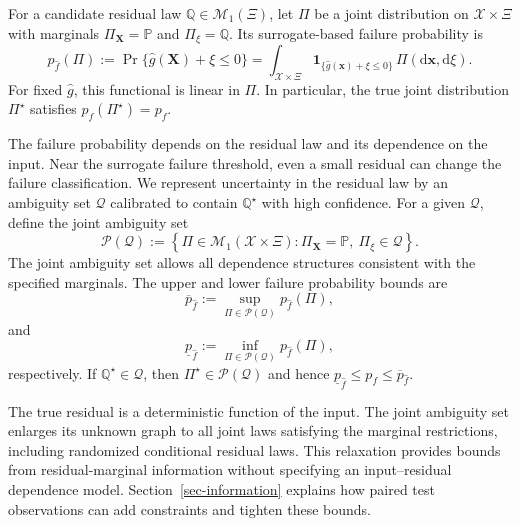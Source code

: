 \documentclass[review,11pt,3p,authoryear,nopreprintline]{elsarticle}
\begin{document}
For a candidate residual law $\mathbb Q\in\mathcal M_1(\Xi)$, let $\Pi$ be a joint distribution on $\mathcal X\times\Xi$ with marginals $\Pi_{\bm X}=\mathbb P$ and $\Pi_\xi=\mathbb Q$. Its surrogate-based failure probability is
\begin{equation}
  p_{\hat f}(\Pi):=\Pr\{\hat g(\bm X)+\xi\le0\}=\int_{\mathcal X\times\Xi}\mathbf 1_{\{\hat g(\bm x)+\xi\le0\}}\,\Pi(\mathrm d\bm x,\mathrm d\xi).
  \label{eq-surrogate-failure-probability}
\end{equation}
For fixed $\hat g$, this functional is linear in $\Pi$. In particular, the true joint distribution $\Pi^\star$ satisfies $p_{\hat f}(\Pi^\star)=p_f$.

The failure probability depends on the residual law and its dependence on the input. Near the surrogate failure threshold, even a small residual can change the failure classification. We represent uncertainty in the residual law by an ambiguity set $\mathcal Q$ calibrated to contain $\mathbb Q^\star$ with high confidence. For a given $\mathcal Q$, define the joint ambiguity set
\[
  \mathcal P(\mathcal Q) :=\left\{\Pi\in\mathcal M_1(\mathcal X\times\Xi):\Pi_{\bm X}=\mathbb P,\ \Pi_\xi\in\mathcal Q\right\}.
\]
The joint ambiguity set allows all dependence structures consistent with the specified marginals. The upper and lower failure probability bounds are
\begin{equation}
  \overline p_{\hat f}:=\sup_{\Pi\in\mathcal P(\mathcal Q)}p_{\hat f}(\Pi),
  \label{eq-upper-bound}
\end{equation}
and
\begin{equation}
  \underline p_{\hat f}:=\inf_{\Pi\in\mathcal P(\mathcal Q)}p_{\hat f}(\Pi),
  \label{eq-lower-bound}
\end{equation}
respectively. If $\mathbb Q^\star\in\mathcal Q$, then $\Pi^\star\in\mathcal P(\mathcal Q)$ and hence $\underline p_{\hat f}\le p_f\le\overline p_{\hat f}$.

The true residual is a deterministic function of the input. The joint ambiguity set enlarges its unknown graph to all joint laws satisfying the marginal restrictions, including randomized conditional residual laws. This relaxation provides bounds from residual-marginal information without specifying an input--residual dependence model. Section~\ref{sec-information} explains how paired test observations can add constraints and tighten these bounds.
\end{document}
